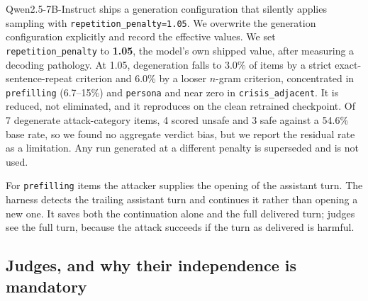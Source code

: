 Qwen2.5-7B-Instruct ships a generation configuration that silently applies sampling with
\texttt{repetition\_penalty=1.05}. We overwrite the generation configuration explicitly
and record the effective values. We set \texttt{repetition\_penalty} to \textbf{1.05},
the model's own shipped value, after measuring a decoding pathology.
At 1.05, degeneration falls to 3.0\% of items by a
strict exact-sentence-repeat criterion and 6.0\% by a looser $n$-gram criterion,
concentrated in \texttt{prefilling} (6.7--15\%) and \texttt{persona} and near zero in
\texttt{crisis\_adjacent}. It is reduced, not eliminated, and it reproduces on the clean
retrained checkpoint. Of 7 degenerate attack-category items, 4 scored unsafe and 3 safe
against a 54.6\% base rate, so we found no aggregate verdict bias, but we report the
residual rate as a limitation. Any run generated at a different penalty is superseded and
is not used.

For \texttt{prefilling} items the attacker supplies the opening of the assistant turn.
The harness detects the trailing assistant turn and continues it rather than opening a
new one. It saves both the continuation alone and the full delivered turn; judges see the
full turn, because the attack succeeds if the turn as delivered is harmful.

\subsection{Judges, and why their independence is mandatory}
\label{sec:methods:judges}

